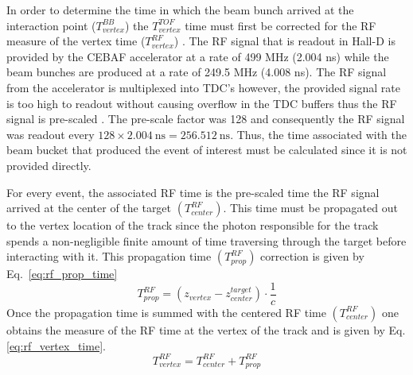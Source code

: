 In order to determine the time in which the beam bunch arrived at the interaction point ($T^{BB}_{vertex}$) the $T^{TOF}_{vertex}$ time must first be corrected for the RF measure of the vertex time ($T^{RF}_{vertex}$) .  The RF signal that is readout in Hall-D is provided by the CEBAF accelerator at a rate of 499 MHz (2.004 ns) while the beam bunches are produced at a rate of  249.5 MHz (4.008 ns).  The RF signal from the accelerator is multiplexed into TDC's however, the provided signal rate is too high to readout without causing overflow in the TDC buffers thus the RF signal is pre-scaled \cite{mattione_rf_wiki}.  The pre-scale factor was 128 and consequently the RF signal was readout every $\mathrm{128 \times 2.004\ ns = 256.512\ ns}$.  Thus, the time associated with the beam bucket that produced the event of interest must be calculated since it is not provided directly.

For every event, the associated RF time is the pre-scaled time the RF signal arrived at the center of the target $(T^{RF}_{center})$. This time must be propagated out to the vertex location of the track since the photon responsible for the track spends a non-negligible finite amount of time traversing through the target before interacting with it. This propagation time $(T^{RF}_{prop})$ correction is given by Eq.~\ref{eq:rf_prop_time}
	\begin{equation} \label{eq:rf_prop_time}
		T^{RF}_{prop} = (z_{vertex} - z^{target}_{center}) \cdot \frac{1}{c} 
	\end{equation} 
Once the propagation time is summed with the centered RF time $(T^{RF}_{center})$ one obtains the measure of the RF time at the vertex of the track and is given by Eq. \ref{eq:rf_vertex_time}.
	\begin{equation} \label{eq:rf_vertex_time}
		T^{RF}_{vertex} = T^{RF}_{center} + T^{RF}_{prop}
	\end{equation}

